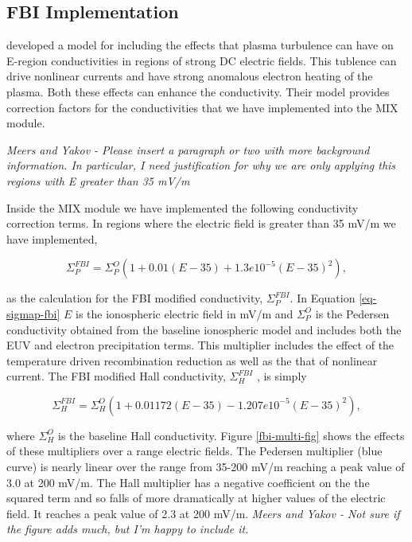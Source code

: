 \documentclass[draft,jgrga]{agutex}
\begin{document}
\begin{article}
\subsection{FBI Implementation}
\label{sec-aeh}

\cite{2011JGRA..116.9304D} developed a model for including the effects that plasma turbulence can have on E-region conductivities in regions of strong DC electric fields.  This tublence can drive nonlinear currents and have strong anomalous electron heating of the plasma.  Both these effects can enhance the conductivity.  Their model provides correction factors for the conductivities that we have implemented into the MIX module.

{\em Meers and Yakov - Please insert a paragraph or two with more background information. In particular, I need justification for why we are only applying this regions with E greater than 35 mV/m}  

Inside the MIX module we have implemented the following conductivity correction terms.   In regions where the electric field is greater than 35 mV/m we have implemented, 

\begin{equation}
\label{eq-sigmap-fbi}
\Sigma_P^{FBI} = \Sigma_P^O(1+0.01 (E - 35) + 1.3e10^{-5}(E - 35)^2),
\end{equation}

as the calculation for the FBI modified conductivity, $\Sigma_P^{FBI}$.  In Equation \ref{eq-sigmap-fbi} $E$ is the ionospheric electric field in mV/m and $\Sigma_P^O$ is the Pedersen conductivity obtained from the baseline ionospheric model and includes both the EUV and electron precipitation terms.  This multiplier includes the effect of the temperature driven recombination reduction as well as the that of nonlinear current.  The FBI modified Hall conductivity, $\Sigma_H^{FBI}$ ,  is simply 

\begin{equation}
\label{eq-sigmah-fbi}
\Sigma_H^{FBI} = \Sigma_H^O(1+0.01172 (E - 35) - 1.207e10^{-5}(E - 35)^2),
\end{equation}

where $\Sigma_H^O$ is the baseline Hall conductivity.   Figure \ref{fbi-multi-fig} shows the effects of these multipliers over a range electric fields.  The Pedersen multiplier (blue curve) is nearly linear over the range from 35-200 mV/m reaching a peak value of 3.0 at 200 mV/m.  The Hall multiplier has a negative coefficient on the the squared term and so falls of more dramatically at higher values of the electric field.  It reaches a peak value of 2.3 at 200 mV/m.  {\em Meers and Yakov - Not sure if the figure adds much, but I'm happy to include it.}


\end{article}
\end{document}
